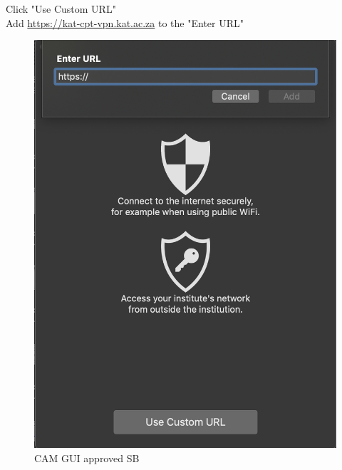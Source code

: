 Click "Use Custom URL"\\
Add  \url{https://kat-cpt-vpn.kat.ac.za} to the "Enter URL"


\begin{figure}[!thb]
	\centering
	\includegraphics[scale=0.8]{Chapters/images/image74.png}
	
	\caption{CAM GUI approved SB }
	\label{fig:image74}
\end{figure}








